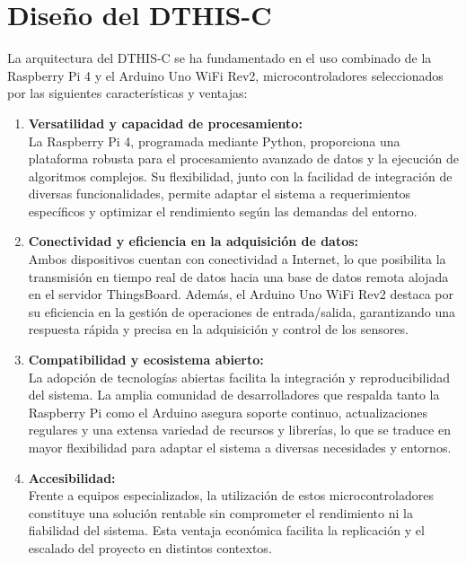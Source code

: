 \documentclass[
  letterpaper,
]{scrbook}
\begin{document}
\section{Diseño del DTHIS-C}\label{diseuxf1o-del-dthis-c}

La arquitectura del DTHIS-C se ha fundamentado en el uso combinado de la
Raspberry Pi 4 y el Arduino Uno WiFi Rev2, microcontroladores
seleccionados por las siguientes características y ventajas:

\begin{enumerate}
\def\labelenumi{\arabic{enumi}.}
\item
  \textbf{Versatilidad y capacidad de procesamiento:}\\
  La Raspberry Pi 4, programada mediante Python, proporciona una
  plataforma robusta para el procesamiento avanzado de datos y la
  ejecución de algoritmos complejos. Su flexibilidad, junto con la
  facilidad de integración de diversas funcionalidades, permite adaptar
  el sistema a requerimientos específicos y optimizar el rendimiento
  según las demandas del entorno.
\item
  \textbf{Conectividad y eficiencia en la adquisición de datos:}\\
  Ambos dispositivos cuentan con conectividad a Internet, lo que
  posibilita la transmisión en tiempo real de datos hacia una base de
  datos remota alojada en el servidor ThingsBoard. Además, el Arduino
  Uno WiFi Rev2 destaca por su eficiencia en la gestión de operaciones
  de entrada/salida, garantizando una respuesta rápida y precisa en la
  adquisición y control de los sensores.
\item
  \textbf{Compatibilidad y ecosistema abierto:}\\
  La adopción de tecnologías abiertas facilita la integración y
  reproducibilidad del sistema. La amplia comunidad de desarrolladores
  que respalda tanto la Raspberry Pi como el Arduino asegura soporte
  continuo, actualizaciones regulares y una extensa variedad de recursos
  y librerías, lo que se traduce en mayor flexibilidad para adaptar el
  sistema a diversas necesidades y entornos.
\item
  \textbf{Accesibilidad:}\\
  Frente a equipos especializados, la utilización de estos
  microcontroladores constituye una solución rentable sin comprometer el
  rendimiento ni la fiabilidad del sistema. Esta ventaja económica
  facilita la replicación y el escalado del proyecto en distintos
  contextos.
\end{enumerate}
\end{document}

